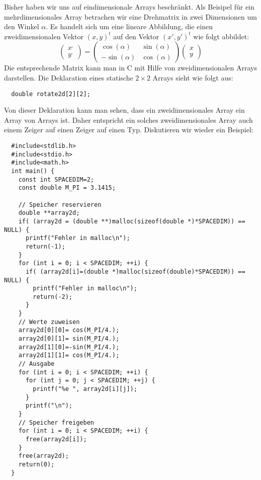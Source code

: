 Bisher haben wir uns auf eindimensionale Arrays beschränkt.
Als Beisipel für ein mehrdimensionales Array betrachen wir eine Drehmatrix in zwei Dimensionen um den Winkel $\alpha$. 
Es handelt sich um eine lineare Abbildung, die einen zweidimensionalen Vektor $(x,y)^t$ auf den Vektor $(x',y')^t$ wie folgt abbildet:
\begin{equation}
  \left(\begin{array}{c}x^{,}\\y^{,}\end{array}\right)=
  \left(\begin{array}{cc} \cos\left(\alpha\right) & \sin\left(\alpha\right) \\
    -\sin\left(\alpha\right) & \cos\left(\alpha\right) 
  \end{array}\right)
  \left(\begin{array}{c}x\\y\end{array}\right)
\end{equation}
Die entsprechende Matrix kann man in C mit Hilfe von zweidimensionalen Arrays darstellen.
Die Deklaration eines statische $2\times2$ Arrays sieht wie folgt aus:
\begin{lstlisting}
  double rotate2d[2][2];
\end{lstlisting}
Von dieser Deklaration kann man sehen, dass ein zweidimensionales Array ein Array von Arrays ist.
Daher entspricht ein solches zweidimensionales Array auch einem Zeiger auf einen Zeiger auf einen Typ.
Diskutieren wir wieder ein Beispiel:
\begin{lstlisting}
  #include<stdlib.h>
  #include<stdio.h>
  #include<math.h>
  int main() {
    const int SPACEDIM=2;
    const double M_PI = 3.1415;

    // Speicher reservieren
    double **array2d;
    if( (array2d = (double **)malloc(sizeof(double *)*SPACEDIM)) == NULL) {
      printf("Fehler in malloc\n");
      return(-1);
    }
    for (int i = 0; i < SPACEDIM; ++i) {
      if( (array2d[i]=(double *)malloc(sizeof(double)*SPACEDIM)) == NULL) {
        printf("Fehler in malloc\n");
        return(-2);
      }
    }
    // Werte zuweisen
    array2d[0][0]= cos(M_PI/4.); 
    array2d[0][1]= sin(M_PI/4.); 
    array2d[1][0]=-sin(M_PI/4.); 
    array2d[1][1]= cos(M_PI/4.); 
    // Ausgabe
    for (int i = 0; i < SPACEDIM; ++i) {
      for (int j = 0; j < SPACEDIM; ++j) {
        printf("%e ", array2d[i][j]);
      }
      printf("\n");
    }
    // Speicher freigeben
    for (int i = 0; i < SPACEDIM; ++i) {
      free(array2d[i]);
    }
    free(array2d);
    return(0);
  }
\end{lstlisting}

